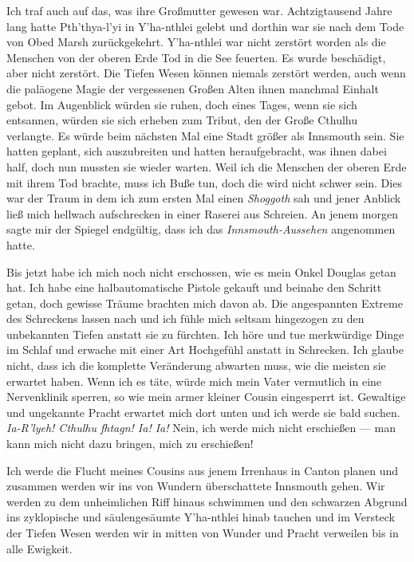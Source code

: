 Ich traf auch auf das, was ihre Großmutter gewesen war. Achtzigtausend Jahre lang hatte Pth’thya-l’yi in Y'ha-nthlei gelebt und dorthin war sie nach dem Tode von Obed Marsh zurückgekehrt. Y'ha-nthlei war nicht zerstört worden als die Menschen von der oberen Erde Tod in die See feuerten. Es wurde beschädigt, aber nicht zerstört. Die Tiefen Wesen können niemals zerstört werden, auch wenn die paläogene Magie der vergessenen Großen Alten ihnen manchmal Einhalt gebot. Im Augenblick würden sie ruhen, doch eines Tages, wenn sie sich entsannen, würden sie sich erheben zum Tribut, den der Große Cthulhu verlangte. Es würde beim nächsten Mal eine Stadt größer als Innsmouth sein. Sie hatten geplant, sich auszubreiten und hatten heraufgebracht, was ihnen dabei half, doch nun mussten sie wieder warten. Weil ich die Menschen der oberen Erde mit ihrem Tod brachte, muss ich Buße tun, doch die wird nicht schwer sein. Dies war der Traum in dem ich zum ersten Mal einen \textit{Shoggoth}  sah und jener Anblick ließ mich hellwach aufschrecken in einer Raserei aus Schreien. An jenem morgen sagte mir der Spiegel endgültig, dass ich das \textit{Innsmouth-Aussehen}  angenommen hatte.

Bis jetzt habe ich mich noch nicht erschossen, wie es mein Onkel Douglas getan hat. Ich habe eine halbautomatische Pistole gekauft und beinahe den Schritt getan, doch gewisse Träume brachten mich davon ab. Die angespannten Extreme des Schreckens lassen nach und ich fühle mich seltsam hingezogen zu den unbekannten Tiefen anstatt sie zu fürchten. Ich höre und tue merkwürdige Dinge im Schlaf und erwache mit einer Art Hochgefühl anstatt in Schrecken. Ich glaube nicht, dass ich die komplette Veränderung abwarten muss, wie die meisten sie erwartet haben. Wenn ich es täte, würde mich mein Vater vermutlich in eine Nervenklinik sperren, so wie mein armer kleiner Cousin eingesperrt ist. Gewaltige und ungekannte Pracht erwartet mich dort unten und ich werde sie bald suchen. \textit{Ia-R'lyeh! Cthulhu fhtagn! Ia! Ia!}  Nein, ich werde mich nicht erschießen --- man kann mich nicht dazu bringen, mich zu erschießen!

Ich werde die Flucht meines Cousins aus jenem Irrenhaus in Canton planen und zusammen werden wir ins von Wundern überschattete Innsmouth gehen. Wir werden zu dem unheimlichen Riff hinaus schwimmen und den schwarzen Abgrund ins zyklopische und säulengesäumte Y'ha-nthlei hinab tauchen und im Versteck der Tiefen Wesen werden wir in mitten von Wunder und Pracht verweilen bis in alle Ewigkeit.